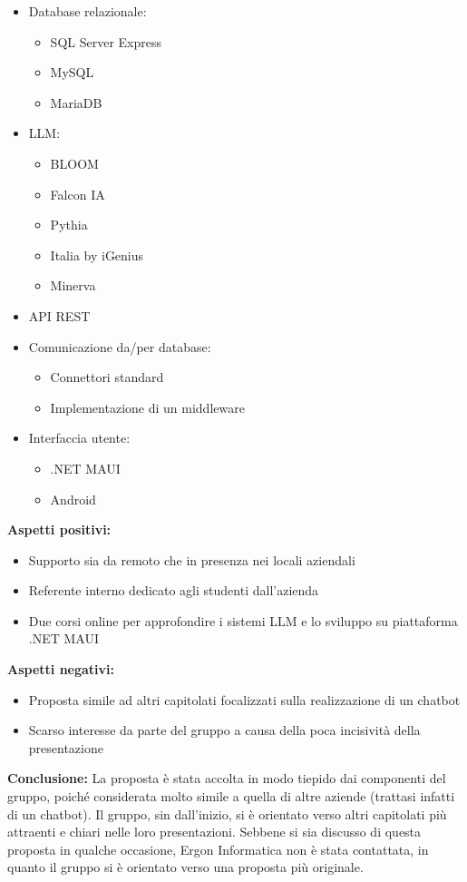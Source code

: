 \documentclass[10pt]{article}
\begin{document}
\begin{itemize}
    \item Database relazionale:
    \begin{itemize}
        \item SQL Server Express
        \item MySQL
        \item MariaDB
    \end{itemize}
    \item LLM:
    \begin{itemize}
        \item BLOOM
        \item Falcon IA
        \item Pythia
        \item Italia by iGenius
        \item Minerva
    \end{itemize}
    \item API REST
    \item Comunicazione da/per database:
    \begin{itemize}
        \item Connettori standard
        \item Implementazione di un middleware
    \end{itemize}
    \item Interfaccia utente:
    \begin{itemize}
        \item .NET MAUI
        \item Android
    \end{itemize}
\end{itemize}
\textbf{Aspetti positivi:}
\begin{itemize}
    \item Supporto sia da remoto che in presenza nei locali aziendali
    \item Referente interno dedicato agli studenti dall’azienda
    \item Due corsi online per approfondire i sistemi LLM e lo sviluppo su piattaforma .NET MAUI
\end{itemize}
\textbf{Aspetti negativi:}
\begin{itemize}
    \item Proposta simile ad altri capitolati focalizzati sulla realizzazione di un chatbot
    \item Scarso interesse da parte del gruppo a causa della poca incisività della presentazione
\end{itemize}
\textbf{Conclusione:}
La proposta è stata accolta in modo tiepido dai componenti del gruppo, poiché considerata molto simile a quella di altre aziende (trattasi infatti di un chatbot). Il gruppo, sin dall’inizio, si è orientato verso altri capitolati più attraenti e chiari nelle loro presentazioni. Sebbene si sia discusso di questa proposta in qualche occasione, Ergon Informatica non è stata contattata, in quanto il gruppo si è orientato verso una proposta più originale.
\end{document}
